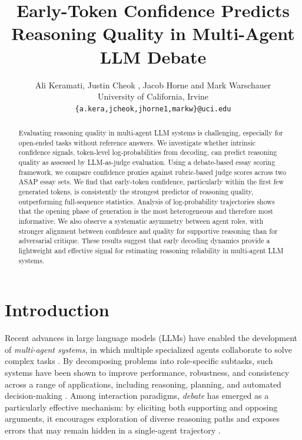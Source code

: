 \documentclass[11pt]{article}
\title{Early-Token Confidence Predicts Reasoning Quality in Multi-Agent LLM Debate}
\author{Ali Keramati, Justin Cheok , Jacob Horne and Mark Warschauer \\
University of California, Irvine\\
\texttt{\{a.kera,jcheok,jhorne1,markw\}@uci.edu} 
}
\begin{document}
\maketitle
\begin{abstract}
Evaluating reasoning quality in multi-agent LLM systems is challenging, especially for open-ended tasks without reference answers. We investigate whether intrinsic confidence signals, token-level log-probabilities from decoding, can predict reasoning quality as assessed by LLM-as-judge evaluation. Using a debate-based essay scoring framework, we compare confidence proxies against rubric-based judge scores across two ASAP essay sets. We find that early-token confidence, particularly within the first few generated tokens, is consistently the strongest predictor of reasoning quality, outperforming full-sequence statistics. Analysis of log-probability trajectories shows that the opening phase of generation is the most heterogeneous and therefore most informative. We also observe a systematic asymmetry between agent roles, with stronger alignment between confidence and quality for supportive reasoning than for adversarial critique. These results suggest that early decoding dynamics provide a lightweight and effective signal for estimating reasoning reliability in multi-agent LLM systems.
\end{abstract}

\section{Introduction}

Recent advances in large language models (LLMs) have enabled the development of \emph{multi-agent systems}, in which multiple specialized agents collaborate to solve complex tasks \cite{wu2023autogenenablingnextgenllm}. By decomposing problems into role-specific subtasks, such systems have been shown to improve performance, robustness, and consistency across a range of applications, including reasoning, planning, and automated decision-making \cite{parmar2025plangenmultiagentframeworkgenerating, han2026llmmultiagentsystemschallenges}. Among interaction paradigms, \emph{debate} has emerged as a particularly effective mechanism: by eliciting both supporting and opposing arguments, it encourages exploration of diverse reasoning paths and exposes errors that may remain hidden in a single-agent trajectory \cite{du2023improvingfactualityreasoninglanguage}.
\end{document}
